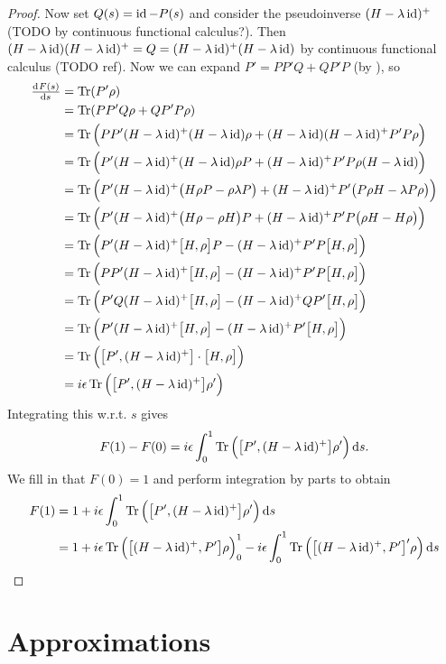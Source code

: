 \begin{proof}
Now set $Q(s) = \operatorname{id} - P(s)$ and consider the pseudoinverse $(H-\lambda\operatorname{id})^+$ (TODO by continuous functional calculus?). Then $(H-\lambda\operatorname{id})(H-\lambda\operatorname{id})^+ = Q = (H-\lambda\operatorname{id})^+(H-\lambda\operatorname{id})$ by continuous functional calculus (TODO ref). Now we can expand $P' = PP'Q + QP'P$ (by ), so
\begin{align*}
\od{F(s)}{s} &= \Tr(P'\rho) \\
&= \Tr(PP'Q\rho + QP'P\rho) \\
&= \Tr\Big(PP'(H-\lambda\id)^+(H-\lambda\id)\rho + (H-\lambda\id)(H-\lambda\id)^+P'P\rho\Big) \\
&= \Tr\Big(P'(H-\lambda\id)^+(H-\lambda\id)\rho P + (H-\lambda\id)^+P'P\rho (H-\lambda\id)\Big) \\
&= \Tr\Big(P'(H-\lambda\id)^+\big(H\rho P - \rho \lambda P\big) + (H-\lambda\id)^+P' \big(P\rho H - \lambda P\rho \big)\Big) \\
&= \Tr\Big(P'(H-\lambda\id)^+\big(H\rho - \rho H\big)P + (H-\lambda\id)^+P'P\big(\rho H - H\rho \big)\Big) \\
&= \Tr\Big(P'(H-\lambda\id)^+\big[H,\rho\big]P - (H-\lambda\id)^+P'P\big[H, \rho\big]\Big) \\
&= \Tr\Big(PP'(H-\lambda\id)^+\big[H,\rho\big] - (H-\lambda\id)^+P'P\big[H, \rho\big]\Big) \\
&= \Tr\Big(P'Q(H-\lambda\id)^+\big[H,\rho\big] - (H-\lambda\id)^+QP'\big[H, \rho\big]\Big) \\
&= \Tr\Big(P'(H-\lambda\id)^+\big[H,\rho\big] - (H-\lambda\id)^+P'\big[H, \rho\big]\Big) \\
&= \Tr\Big(\big[P', (H-\lambda\id)^+\big]\cdot\big[H,\rho\big]\Big) \\
&= i\epsilon\Tr\Big(\big[P', (H-\lambda\id)^+\big]\rho'\Big) 
\end{align*}
Integrating this w.r.t. $s$ gives
\[ F(1) - F(0) = i\epsilon\int_0^1 \operatorname{Tr}\Big(\big[P', (H-\lambda\operatorname{id})^+\big]\rho'\Big)  \operatorname{d \!}{s}. \]
We fill in that $F(0) = 1$ and perform integration by parts to obtain
\begin{align*}
F(1) &= 1 + i\epsilon\int_0^1 \operatorname{Tr}\Big(\big[P', (H-\lambda\operatorname{id})^+\big]\rho'\Big)  \operatorname{d \!}{s} \\
&= 1 + i\epsilon\operatorname{Tr}\Big(\big[(H-\lambda\operatorname{id})^+, P'\big]\rho\Big)_0^1 - i\epsilon\int_0^1 \operatorname{Tr}\Big(\big[(H-\lambda\operatorname{id})^+, P'\big]'\rho\Big)  \operatorname{d \!}{s}
\end{align*}
\end{proof}


\chapter{Approximations}
